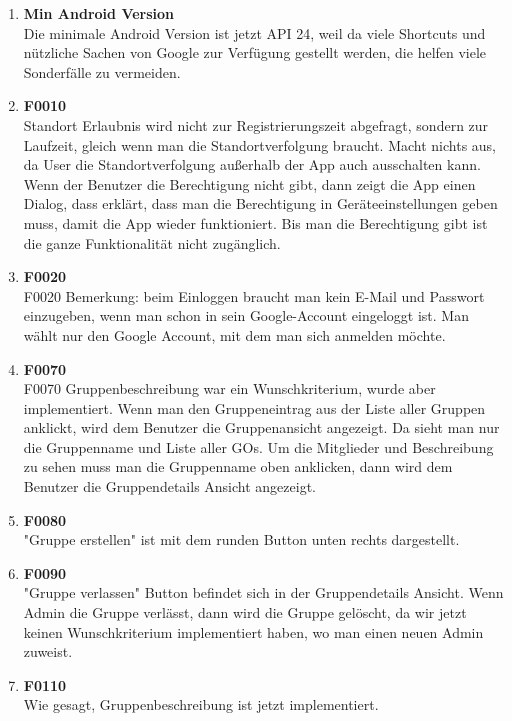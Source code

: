 \documentclass[11pt,a4paper]{scrartcl}
\begin{document}
\begin{enumerate}
	\item \textbf{Min Android Version} \\
	
	Die minimale Android Version ist jetzt API 24, weil da viele Shortcuts und nützliche Sachen von Google zur Verfügung gestellt werden, die helfen viele Sonderfälle zu vermeiden.	
	
	\item \textbf{F0010}\\Standort Erlaubnis wird nicht zur Registrierungszeit abgefragt, sondern zur Laufzeit, gleich wenn man die Standortverfolgung braucht. Macht nichts aus, da User die Standortverfolgung außerhalb der App auch ausschalten kann.
Wenn der Benutzer die Berechtigung nicht gibt, dann zeigt die App einen Dialog, dass erklärt, dass man die Berechtigung in Geräteeinstellungen geben muss, damit die App wieder funktioniert. Bis man die Berechtigung gibt ist die ganze Funktionalität nicht zugänglich.
\item \textbf{F0020}\\
F0020 Bemerkung: beim Einloggen braucht man kein E-Mail und Passwort einzugeben, wenn man schon in sein Google-Account eingeloggt ist. Man wählt nur den Google Account, mit dem man sich anmelden möchte.
\item \textbf{F0070}\\
F0070 Gruppenbeschreibung war ein Wunschkriterium, wurde aber implementiert.
Wenn man den Gruppeneintrag aus der Liste aller Gruppen anklickt, wird dem Benutzer die Gruppenansicht angezeigt. Da sieht man nur die Gruppenname und Liste aller GOs. Um die Mitglieder und Beschreibung zu sehen muss man die Gruppenname oben anklicken, dann wird dem Benutzer die Gruppendetails Ansicht angezeigt.

\item \textbf{F0080}\\ "Gruppe erstellen" ist mit dem runden Button unten rechts dargestellt.

\item \textbf{F0090}\\ "Gruppe verlassen" Button befindet sich in der Gruppendetails Ansicht. Wenn Admin die Gruppe verlässt, dann wird die Gruppe gelöscht, da wir jetzt keinen Wunschkriterium implementiert haben, wo man einen neuen Admin zuweist.

\item \textbf{F0110}\\ Wie gesagt, Gruppenbeschreibung ist jetzt implementiert.


\end{enumerate}
\end{document}
